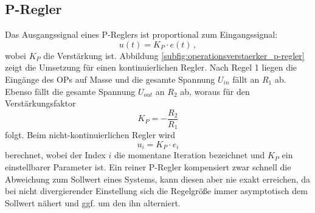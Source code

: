 \subsection{P-Regler}\label{p-regler}
Das Ausgangssignal eines P-Reglers ist proportional zum Eingangssignal:
\begin{equation}\label{eq:p-regler_01}
	u(t)=K_P\cdot e(t)\,,
\end{equation}
wobei $K_P$ die Verstärkung ist. Abbildung
\ref{subfig:operationsverstaerker_p-regler} zeigt die Umsetzung für einen
kontinuierlichen Regler. Nach Regel 1 liegen die Eingänge des OPs auf Masse und die gesamte Spannung $U_{in}$ fällt an $R_1$ ab.
Ebenso fällt die gesamte Spannung $U_{out}$ an $R_2$ ab, woraus für den
Verstärkungsfaktor
\begin{equation}\label{eq:p-regler_02}
	K_P=-\frac{R_2}{R_1}
\end{equation}
folgt. Beim nicht-kontinuierlichen Regler wird
\begin{equation}\label{eq:p-regler_03}
	u_i=K_P\cdot e_i
\end{equation}
berechnet, wobei der Index $i$ die momentane Iteration bezeichnet und $K_P$ ein
einstellbarer Parameter ist. Ein reiner P-Regler kompensiert zwar schnell die
Abweichung zum Sollwert eines Systems, kann diesen aber nie exakt erreichen, da
bei nicht divergierender Einstellung sich die Regelgröße immer asymptotisch
dem Sollwert nähert und ggf. um den ihn alterniert.

